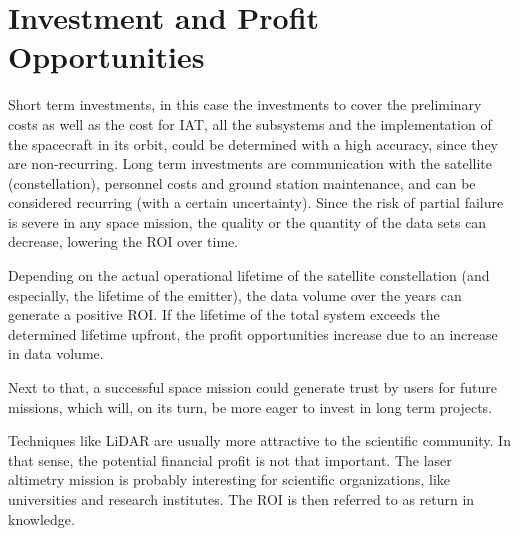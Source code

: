 \section{Investment and Profit Opportunities}
	\label{blMAipo}
Short term investments, in this case the investments to cover the preliminary costs as well as the cost for \acs{IAT}, all the subsystems and the implementation of the spacecraft in its orbit, could be determined with a high accuracy, since they are non-recurring. Long term investments are communication with the satellite (constellation), personnel costs and ground station maintenance, and can be considered recurring (with a certain uncertainty). Since the risk of partial failure is severe in any space mission, the quality or the quantity of the data sets can decrease, lowering the \acs{ROI} over time. 

Depending on the actual operational lifetime of the satellite constellation (and especially, the lifetime of the emitter), the data volume over the years can generate a positive \acs{ROI}. If the lifetime of the total system exceeds the determined lifetime upfront, the profit opportunities increase due to an increase in data volume. 

Next to that, a successful space mission could generate trust by users for future missions, which will, on its turn, be more eager to invest in long term projects.

Techniques like \acs{LiDAR} are usually more attractive to the scientific community. In that sense, the potential financial profit is not that important. The \acs{laser} altimetry mission is probably interesting for scientific organizations, like universities and research institutes. The \acs{ROI} is then referred to as return in knowledge.  